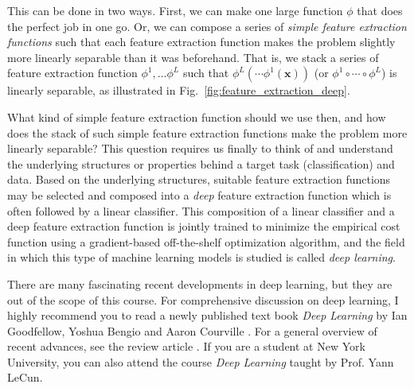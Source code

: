 \documentclass{report}
\newcommand{\vect}[1]{\mathbf{#1}}
\newcommand{\vx}[0]{\vect{x}}
\begin{document}
This can be done in two ways. First, we can make one large function $\phi$ that
does the perfect job in one go. Or, we can compose a series of {\it simple
feature extraction functions} such that each feature extraction function makes
the problem slightly more linearly separable than it was beforehand. That is, we
stack a series of feature extraction function $\phi^1, \ldots \phi^L$ such that
$\phi^L(\cdots\phi^1(\vx))$ (or $\phi^1 \circ \cdots \circ \phi^L$) is linearly
separable, as illustrated in Fig.~\ref{fig:feature_extraction_deep}.

What kind of simple feature extraction function should we use then, and how does
the stack of such simple feature extraction functions make the problem more
linearly separable? This question requires us finally to think of and understand
the underlying structures or properties behind a target task (classification)
and data. Based on the underlying structures, suitable feature extraction
functions may be selected and composed into a {\it deep} feature extraction
function which is often followed by a linear classifier. This composition of a
linear classifier and a deep feature extraction function is jointly trained to
minimize the empirical cost function using a gradient-based off-the-shelf
optimization algorithm, and the field in which this type of machine learning
models is studied is called {\it deep learning}. 

There are many fascinating recent developments in deep learning, but they are
out of the scope of this course. For comprehensive discussion on deep learning,
I highly recommend you to read a newly published text book {\it Deep Learning}
by Ian Goodfellow, Yoshua Bengio and Aaron Courville \cite{goodfellow2016deep}.
For a general overview of recent advances, see the review article
\cite{lecun2015deep}. If you are a student at New York University, you can also
attend the course {\it Deep Learning} taught by Prof. Yann LeCun.
\end{document}
